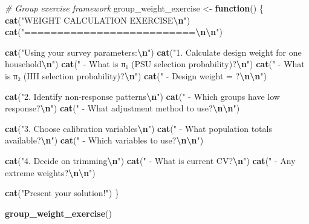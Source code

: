 \documentclass[
]{article}
\newenvironment{Shaded}{\begin{snugshade}}{\end{snugshade}}
\newcommand{\CommentTok}[1]{\textcolor[rgb]{0.56,0.35,0.01}{\textit{#1}}}
\newcommand{\ControlFlowTok}[1]{\textcolor[rgb]{0.13,0.29,0.53}{\textbf{#1}}}
\newcommand{\FunctionTok}[1]{\textcolor[rgb]{0.13,0.29,0.53}{\textbf{#1}}}
\newcommand{\NormalTok}[1]{#1}
\newcommand{\OtherTok}[1]{\textcolor[rgb]{0.56,0.35,0.01}{#1}}
\newcommand{\SpecialCharTok}[1]{\textcolor[rgb]{0.81,0.36,0.00}{\textbf{#1}}}
\newcommand{\StringTok}[1]{\textcolor[rgb]{0.31,0.60,0.02}{#1}}
\begin{document}
\begin{Shaded}
\begin{Highlighting}[]
\CommentTok{\# Group exercise framework}
\NormalTok{group\_weight\_exercise }\OtherTok{\textless{}{-}} \ControlFlowTok{function}\NormalTok{() \{}
  \FunctionTok{cat}\NormalTok{(}\StringTok{"WEIGHT CALCULATION EXERCISE}\SpecialCharTok{\textbackslash{}n}\StringTok{"}\NormalTok{)}
  \FunctionTok{cat}\NormalTok{(}\StringTok{"==========================}\SpecialCharTok{\textbackslash{}n\textbackslash{}n}\StringTok{"}\NormalTok{)}
  
  \FunctionTok{cat}\NormalTok{(}\StringTok{"Using your survey parameters:}\SpecialCharTok{\textbackslash{}n}\StringTok{"}\NormalTok{)}
  \FunctionTok{cat}\NormalTok{(}\StringTok{"1. Calculate design weight for one household}\SpecialCharTok{\textbackslash{}n}\StringTok{"}\NormalTok{)}
  \FunctionTok{cat}\NormalTok{(}\StringTok{"   {-} What is π₁ (PSU selection probability)?}\SpecialCharTok{\textbackslash{}n}\StringTok{"}\NormalTok{)}
  \FunctionTok{cat}\NormalTok{(}\StringTok{"   {-} What is π₂ (HH selection probability)?}\SpecialCharTok{\textbackslash{}n}\StringTok{"}\NormalTok{)}
  \FunctionTok{cat}\NormalTok{(}\StringTok{"   {-} Design weight = ?}\SpecialCharTok{\textbackslash{}n\textbackslash{}n}\StringTok{"}\NormalTok{)}
  
  \FunctionTok{cat}\NormalTok{(}\StringTok{"2. Identify non{-}response patterns}\SpecialCharTok{\textbackslash{}n}\StringTok{"}\NormalTok{)}
  \FunctionTok{cat}\NormalTok{(}\StringTok{"   {-} Which groups have low response?}\SpecialCharTok{\textbackslash{}n}\StringTok{"}\NormalTok{)}
  \FunctionTok{cat}\NormalTok{(}\StringTok{"   {-} What adjustment method to use?}\SpecialCharTok{\textbackslash{}n\textbackslash{}n}\StringTok{"}\NormalTok{)}
  
  \FunctionTok{cat}\NormalTok{(}\StringTok{"3. Choose calibration variables}\SpecialCharTok{\textbackslash{}n}\StringTok{"}\NormalTok{)}
  \FunctionTok{cat}\NormalTok{(}\StringTok{"   {-} What population totals available?}\SpecialCharTok{\textbackslash{}n}\StringTok{"}\NormalTok{)}
  \FunctionTok{cat}\NormalTok{(}\StringTok{"   {-} Which variables to use?}\SpecialCharTok{\textbackslash{}n\textbackslash{}n}\StringTok{"}\NormalTok{)}
  
  \FunctionTok{cat}\NormalTok{(}\StringTok{"4. Decide on trimming}\SpecialCharTok{\textbackslash{}n}\StringTok{"}\NormalTok{)}
  \FunctionTok{cat}\NormalTok{(}\StringTok{"   {-} What is current CV?}\SpecialCharTok{\textbackslash{}n}\StringTok{"}\NormalTok{)}
  \FunctionTok{cat}\NormalTok{(}\StringTok{"   {-} Any extreme weights?}\SpecialCharTok{\textbackslash{}n\textbackslash{}n}\StringTok{"}\NormalTok{)}
  
  \FunctionTok{cat}\NormalTok{(}\StringTok{"Present your solution!"}\NormalTok{)}
\NormalTok{\}}

\FunctionTok{group\_weight\_exercise}\NormalTok{()}
\end{Highlighting}
\end{Shaded}
\end{document}
